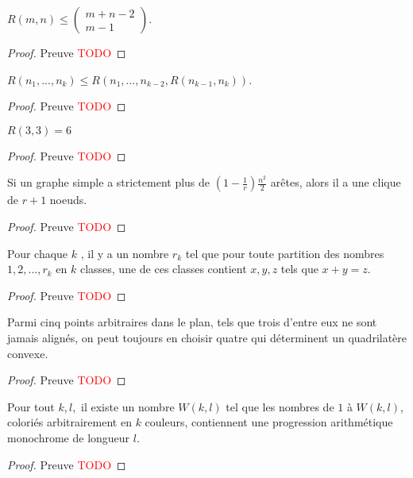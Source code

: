 \begin{mycorr}
  $R(m, n) \leq (
    \begin{array}{c}
      m+n-2 \\
      m-1
    \end{array})$.
  \begin{proof}
     Preuve \textcolor{red}{TODO}
  \end{proof}
\end{mycorr}

\begin{mytheo}
  $R(n_1, ..., n_k) \leq R(n_1, ..., n_{k-2}, R(n_{k-1}, n_k))$.
  \begin{proof}
     Preuve \textcolor{red}{TODO}
  \end{proof}
\end{mytheo}

\begin{mytheo} 
  $R(3, 3) = 6$
  \begin{proof}
     Preuve \textcolor{red}{TODO}
  \end{proof}
\end{mytheo}

\begin{mytheo} 
  Si un graphe simple a strictement plus de $(1 − \frac{1}{r}) \frac{n^2}{2}$ arêtes, alors il a une clique de $r + 1$ noeuds.
  \begin{proof}
     Preuve \textcolor{red}{TODO}
  \end{proof}
\end{mytheo}

\begin{mytheo} 
  Pour chaque $k$ , il y a un nombre $r_k$ tel que pour toute partition des nombres $1, 2, ..., r_k$ en $k$ classes, une de ces classes contient $x, y , z$ tels que $x + y = z$.
  \begin{proof}
     Preuve \textcolor{red}{TODO}
  \end{proof}
\end{mytheo}

\begin{mytheo} 
  Parmi cinq points arbitraires dans le plan, tels que trois d’entre eux ne sont jamais alignés, on peut toujours en choisir quatre qui déterminent un quadrilatère convexe.
  \begin{proof}
     Preuve \textcolor{red}{TODO}
  \end{proof}
\end{mytheo}

\begin{mytheo} 
  Pour tout $k , l,$ il existe un nombre $W (k , l)$ tel que les nombres de $1$ à $W (k , l)$, coloriés arbitrairement en $k$ couleurs, contiennent une progression arithmétique monochrome de longueur $l$.
  \begin{proof}
     Preuve \textcolor{red}{TODO}
  \end{proof}
\end{mytheo}







